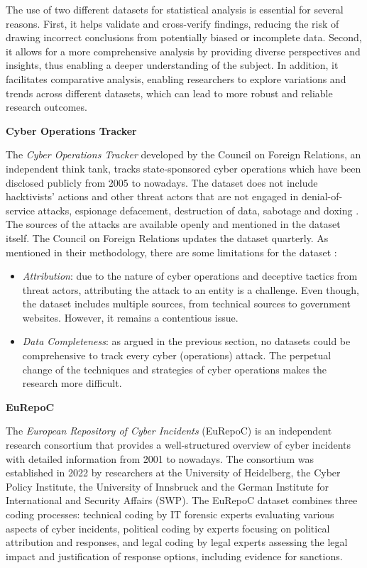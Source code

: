 The use of two different datasets for statistical analysis is essential for several reasons. First, it helps validate and cross-verify findings, reducing the risk of drawing incorrect conclusions from potentially biased or incomplete data. Second, it allows for a more comprehensive analysis by providing diverse perspectives and insights, thus enabling a deeper understanding of the subject. In addition, it facilitates comparative analysis, enabling researchers to explore variations and trends across different datasets, which can lead to more robust and reliable research outcomes.

\newpage
\textbf{Cyber Operations Tracker}

The \textit{Cyber Operations Tracker} developed by the Council on Foreign Relations, an independent think tank, tracks state-sponsored cyber operations which have been disclosed publicly from 2005 to nowadays. The dataset does not include hacktivists' actions and other threat actors that are not engaged in denial-of-service attacks, espionage defacement, destruction of data, sabotage and doxing \autocite{councilonforeignrelations_2023_tracking}. The sources of the attacks are available openly and mentioned in the dataset itself. The Council on Foreign Relations updates the dataset quarterly. As mentioned in their methodology, there are some limitations for the dataset \autocite{councilonforeignrelations_2023_tracking}:

\begin{itemize}
    \item \textit{Attribution}: due to the nature of cyber operations and deceptive tactics from threat actors, attributing the attack to an entity is a challenge. Even though, the dataset includes multiple sources, from technical sources to government websites. However, it remains a contentious issue.
    \item \textit{Data Completeness}: as argued in the previous section, no datasets could be comprehensive to track every cyber (operations) attack. The perpetual change of the techniques and strategies of cyber operations makes the research more difficult.
\end{itemize}

\textbf{EuRepoC}

The \textit{European Repository of Cyber Incidents} (EuRepoC) is an independent research consortium that provides a well-structured overview of cyber incidents with detailed information from 2001 to nowadays. The consortium was established in 2022 by researchers at the University of Heidelberg, the Cyber Policy Institute, the University of Innsbruck and the German Institute for International and Security Affairs (SWP). The EuRepoC dataset combines three coding processes: technical coding by IT forensic experts evaluating various aspects of cyber incidents, political coding by experts focusing on political attribution and responses, and legal coding by legal experts assessing the legal impact and justification of response options, including evidence for sanctions. 


